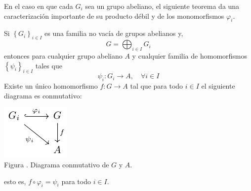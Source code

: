 \documentclass[12pt]{report}
\theoremstyle{largebreak}
\newcommand\cf[3]{\ensuremath{#1:#2\rightarrow#3}}
\newcounter{figcount}
\begin{document}
    En el caso en que cada $G_i$ sea un grupo abeliano, el siguiente teorema da una caracterización importante de su producto débil y de los monomorfismos $\varphi_i$.

    \begin{theor}
        \label{caractSumDir_1}
        Si $\left\{G_i \right\}_{ i\in I}$ es una familia no vacía de grupos abelianos y,
        \begin{equation*}
            G=\bigoplus_{ i\in I}G_i
        \end{equation*}
        entonces para cualquier grupo abeliano $A$ y cualquier familia de homomorfismos $\left\{\psi_i\right\}_{ i\in I}$ tales que
        \begin{equation*}
            \cf{\psi_i}{G_i}{A},\quad\forall i\in I
        \end{equation*}
        Existe un único homomorfismo $\cf{f}{G}{A}$ tal que para todo $i\in I$ el siguiente diagrama es conmutativo:

        \begin{minipage}{\textwidth}
            \begin{center}
                \includegraphics[scale=1.5]{images/fig_1.pdf}\\
                Figura \thefigcount. Diagrama conmutativo de $G$ y $A$.
            \end{center}
        \end{minipage}

        esto es, $f\circ\varphi_i=\psi_i$ para todo $i\in I$.
    \end{theor}
\end{document}
